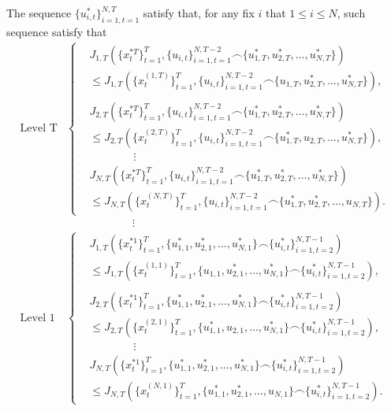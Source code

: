 \documentclass[letterpaper, 10 pt, conference]{ieeeconf}  %
\begin{document}
The sequence $\{ u_{i,t}^{*}\}_{i=1,t=1}^{N,T}$ satisfy that, for any fix $i$ that $1 \leq i \leq N$, such 
sequence satisfy that 
\begin{equation}\label{eq:nashIneq}
    \begin{split}
        \text{Level T}
        &\begin{cases}
            &J_{1,T}(\{x_{t}^{*T}\}_{t=1}^{T}, \{u_{i,t}\}_{i=1,t=1}^{N,T-2} \frown \{u_{1,T}^{*},u_{2,T}^{*},\dots,u_{N,T}^{*}\}) \\ & \leq J_{1,T}(\{x_{t}^{(1,T)}\}_{t=1}^{T}, \{u_{i,t}\}_{i=1,t=1}^{N,T-2} \frown \{u_{1,T},u_{2,T}^{*},\dots,u_{N,T}^{*}\}),\\ \\
            &J_{2,T}(\{x_{t}^{*T}\}_{t=1}^{T}, \{u_{i,t}\}_{i=1,t=1}^{N,T-2} \frown \{u_{1,T}^{*},u_{2,T}^{*},\dots,u_{N,T}^{*}\}) \\ & \leq J_{2,T}(\{x_{t}^{(2,T)}\}_{t=1}^{T}, \{u_{i,t}\}_{i=1,t=1}^{N,T-2} \frown \{u_{1,T}^{*},u_{2,T},\dots,u_{N,T}^{*}\}),\\
            & \qquad \qquad \vdots \\
            &J_{N,T}(\{x_{t}^{*T}\}_{t=1}^{T}, \{u_{i,t}\}_{i=1,t=1}^{N,T-2} \frown \{u_{1,T}^{*},u_{2,T}^{*},\dots,u_{N,T}^{*}\}) \\ & \leq J_{N,T}(\{x_{t}^{(N,T)}\}_{t=1}^{T}, \{u_{i,t}\}_{i=1,t=1}^{N,T-2} \frown \{u_{1,T}^{*},u_{2,T}^{*},\dots,u_{N,T}\}).
        \end{cases}
    \\ &\qquad \qquad \qquad \vdots \\
    \text{Level 1}
        &\begin{cases}
            &J_{1,T}(\{x_{t}^{*1}\}_{t=1}^{T}, \{u_{1,1}^{*},u_{2,1}^{*},\dots,u_{N,1}^{*}\} \frown \{u_{i,t}^{*}\}_{i=1,t=2}^{N,T-1}) \\ & \leq J_{1,T}(\{x_{t}^{(1,1)}\}_{t=1}^{T}, \{u_{1,1},u_{2,1}^{*},\dots,u_{N,1}^{*}\} \frown \{u_{i,t}^{*}\}_{i=1,t=2}^{N,T-1}),\\ \\
            &J_{2,T}(\{x_{t}^{*1}\}_{t=1}^{T}, \{u_{1,1}^{*},u_{2,1}^{*},\dots,u_{N,1}^{*}\} \frown \{u_{i,t}^{*}\}_{i=1,t=2}^{N,T-1}) \\ & \leq J_{2,T}(\{x_{t}^{(2,1)}\}_{t=1}^{T}, \{u_{1,1}^{*},u_{2,1},\dots,u_{N,1}^{*}\} \frown \{u_{i,t}^{*}\}_{i=1,t=2}^{N,T-1}),\\
            & \qquad \qquad \vdots \\
            &J_{N,T}(\{x_{t}^{*1}\}_{t=1}^{T}, \{u_{1,1}^{*},u_{2,1}^{*},\dots,u_{N,1}^{*}\} \frown \{u_{i,t}^{*}\}_{i=1,t=2}^{N,T-1}) \\ & \leq J_{N,T}(\{x_{t}^{(N,1)}\}_{t=1}^{T}, \{u_{1,1}^{*},u_{2,1}^{*},\dots,u_{N,1}\} \frown \{u_{i,t}^{*}\}_{i=1,t=2}^{N,T-1}).
        \end{cases}
    \end{split}
\end{equation}
\end{document}
